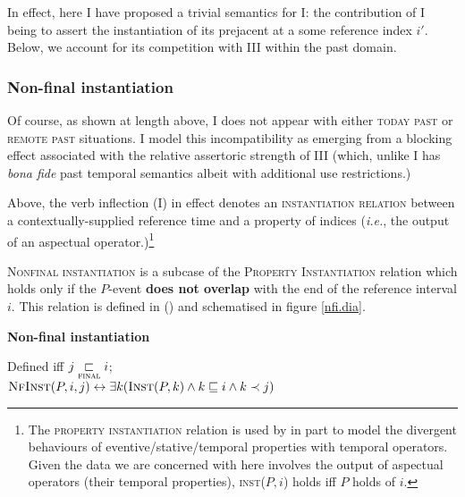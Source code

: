 \noindent In effect, here I have proposed a trivial semantics for \gls{I}: the contribution of \gls{I} being to assert the instantiation of its prejacent at a some reference index $ i' $. Below, we account for its competition with \gls{III} within the past domain.
\subsubsection{Non-final instantiation}

Of course, as shown at length above, \gls{I} does not appear with either \textsc{today past} or \textsc{remote past} situations. I model this incompatibility as emerging from a blocking effect associated with the relative assertoric strength of \gls{III} (which, unlike \gls{I} has \textit{bona fide} past temporal semantics albeit with additional use restrictions.)



Above, the verb inflection (\gls{I}) in effect denotes an \textsc{instantiation relation} between a contextually-supplied reference time and a property of indices (\textit{i.e.}, the output of an aspectual operator.)\footnote{The \textsc{property instantiation} relation is used by \citet{Deo2006,Condoravdi2014} in part to model the divergent behaviours of eventive/stative/temporal properties with temporal operators. Given the data we are concerned with here involves the output of aspectual operators (their temporal properties), \textsc{inst}($ P,i $) holds iff $ P $ holds of $ i $.}

\textsc{Nonfinal instantiation} is a subcase of the \textsc{Property Instantiation} relation which holds only if the $ P $-event \textbf{does not overlap} with the end of the reference interval $ i $. This relation is defined in () and schematised in figure \ref{nfi.dia}.

\pex\textbf{Non-final instantiation}

Defined iff $ j\underset{\textsc{final}}{\sqsubset}i $;\\ $\textsc{NfInst}(P,i,j)\leftrightarrow\exists k(\textsc{Inst}(P,k)\wedge k\sqsubseteq i\wedge k\prec j) $\xe


